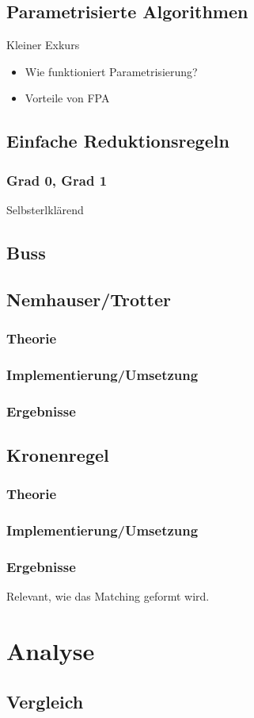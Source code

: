 \documentclass[a4paper]{article}
\begin{document}
\subsection{Parametrisierte Algorithmen}
Kleiner Exkurs
\begin{itemize}
\item Wie funktioniert Parametrisierung?
\item Vorteile von FPA
\end{itemize}
\subsection{Einfache Reduktionsregeln}
\subsubsection{Grad 0, Grad 1}
Selbsterlklärend

\subsection{Buss}

\subsection{Nemhauser/Trotter}

\subsubsection{Theorie}

\subsubsection{Implementierung/Umsetzung}

\subsubsection{Ergebnisse}


\subsection{Kronenregel}

\subsubsection{Theorie}

\subsubsection{Implementierung/Umsetzung}

\subsubsection{Ergebnisse}
Relevant, wie das Matching geformt wird. 
\section{Analyse}

\subsection{Vergleich}

\newpage
\printbibliography
\end{document}
